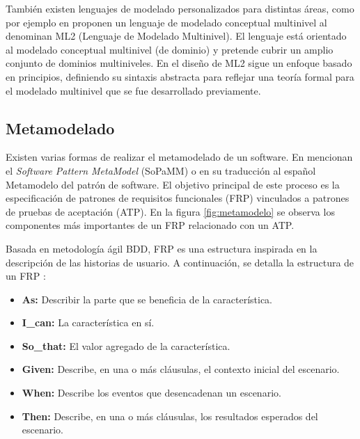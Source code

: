 También existen lenguajes de modelado personalizados para distintas áreas, como por ejemplo en \cite{Multi-level} proponen un lenguaje de modelado conceptual multinivel al denominan ML2 (Lenguaje de Modelado Multinivel). El lenguaje está orientado al modelado conceptual multinivel (de dominio) y pretende cubrir un amplio conjunto de dominios multiniveles. En el diseño de ML2 sigue un enfoque basado en principios, definiendo su sintaxis abstracta para reflejar una teoría formal para el modelado multinivel que se fue desarrollado previamente.

\subsection{Metamodelado}

Existen varias formas de realizar el metamodelado de un software. En \cite{Mohamed} mencionan el \textit{Software Pattern MetaModel} (SoPaMM) o en su traducción al español Metamodelo del patrón de software. El objetivo principal de este proceso es la especificación de patrones de requisitos funcionales (FRP) vinculados a patrones de pruebas de aceptación (ATP). En la figura \ref{fig:metamodelo} se observa los componentes más importantes de un FRP relacionado con un ATP.

Basada en metodología ágil BDD, FRP es una estructura inspirada en la descripción de las historias de usuario. A continuación, se detalla la estructura de un FRP \cite{Mohamed}:

\begin{itemize}
	\item \textbf{As: }Describir la parte que se beneficia de la característica.
	\item \textbf{I\_can: }La característica en sí.
	\item \textbf{So\_that:} El valor agregado de la característica.
	\item \textbf{Given:} Describe, en una o más cláusulas, el contexto inicial del escenario.
	\item \textbf{When:} Describe los eventos que desencadenan un escenario.
	\item \textbf{Then:} Describe, en una o más cláusulas, los resultados esperados del escenario.
\end{itemize}

